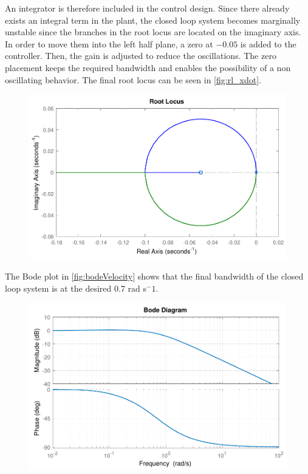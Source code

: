 An integrator is therefore included in the control design. Since there already exists an integral term in the plant, the closed loop system becomes marginally unstable since the branches in the root locus are located on the imaginary axis. In order to move them into the left half plane, a zero at $-0.05$ is added to the controller. Then, the gain is adjusted to reduce the oscillations. The zero placement keeps the required bandwidth and enables the possibility of a non oscillating behavior. The final root locus can be seen in \autoref{fig:rl_xdot}.
%
\begin{figure}[H]
	\includegraphics[scale=.7]{figures/rl_xdot}
	\centering			
	\label{fig:rl_xdot}
\end{figure}
%
The Bode plot in \autoref{fig:bodeVelocity} shows that the final bandwidth of the closed loop system is at the desired 0.7 rad s$^-1$.
%
\begin{figure}[H]
	\includegraphics[scale=.7]{figures/bodeVelocity}
	\centering			
	\label{fig:bodeVelocity}
\end{figure}

